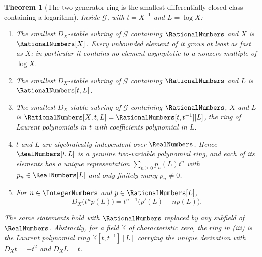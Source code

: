 \documentclass[11pt,oneside]{article}
\theoremstyle{plain}
\newtheorem{theorem}{Theorem}[section]
\theoremstyle{definition}
\theoremstyle{remark}
\newcommand{\K}{\mathbb{K}}
\newcommand{\DX}{D_{X}}                                  %
\begin{document}
\begin{theorem}[The two-generator ring is the smallest differentially closed
class containing a logarithm]
\label{plt:thm:mot-smallest-differential-algebra}
Inside \(\mathcal{G}\), with \(t=X^{-1}\) and \(L=\log X\):
\begin{enumerate}
\item The smallest \(\DX\)-stable subring of \(\mathcal{G}\) containing
  \(\RationalNumbers\) and \(X\) is \(\RationalNumbers[X]\).  Every unbounded
  element of it grows at least as fast as \(X\); in particular it contains no
  element asymptotic to a nonzero multiple of \(\log X\).
\item The smallest \(\DX\)-stable subring of \(\mathcal{G}\) containing
  \(\RationalNumbers\) and \(L\) is \(\RationalNumbers[t,L]\).
\item The smallest \(\DX\)-stable subring of \(\mathcal{G}\) containing
  \(\RationalNumbers\), \(X\) and \(L\) is
  \(\RationalNumbers[X,t,L]=\RationalNumbers[t,t^{-1}][L]\), the ring of
  Laurent polynomials in \(t\) with coefficients polynomial in \(L\).
\item \(t\) and \(L\) are algebraically independent over \(\RealNumbers\).
  Hence \(\RealNumbers[t,L]\) is a genuine two-variable polynomial ring, and
  each of its elements has a \emph{unique} representation
  \(\sum_{n\ge0}p_{n}(L)t^{n}\) with \(p_{n}\in\RealNumbers[L]\) and only
  finitely many \(p_{n}\ne0\).
\item For \(n\in\IntegerNumbers\) and \(p\in\RationalNumbers[L]\),
  \begin{equation}\label{plt:eq:mot-block-derivative}
    \DX\bigl(t^{n}p(L)\bigr)=t^{n+1}\bigl(p'(L)-np(L)\bigr).
  \end{equation}
\end{enumerate}
The same statements hold with \(\RationalNumbers\) replaced by any subfield of
\(\RealNumbers\).  Abstractly, for a field \(\K\) of characteristic zero, the
ring in (iii) is the Laurent polynomial ring \(\K[t,t^{-1}][L]\) carrying the
unique derivation with \(\DX t=-t^{2}\) and \(\DX L=t\).
\end{theorem}
\end{document}

